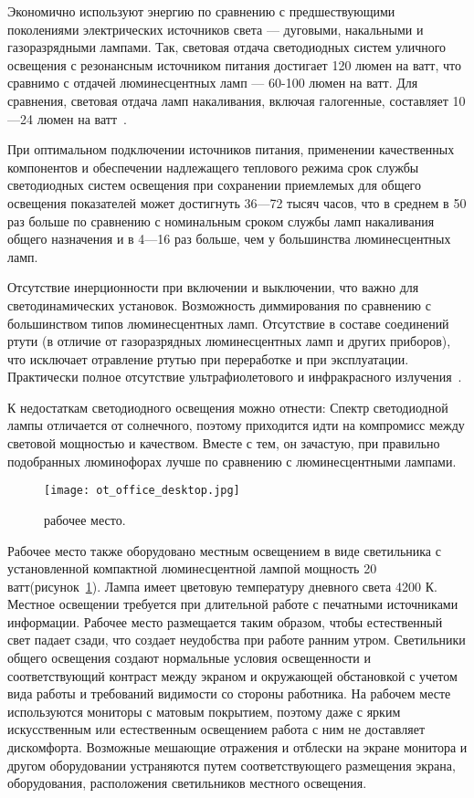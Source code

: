 Экономично используют энергию по сравнению с предшествующими поколениями электрических источников света --- дуговыми, накальными и газоразрядными лампами.
Так, световая отдача светодиодных систем уличного освещения с резонансным источником питания достигает 120 люмен на ватт, что сравнимо с отдачей люминесцентных ламп --- 60-100 люмен на ватт.
Для сравнения, световая отдача ламп накаливания, включая галогенные, составляет 10—24 люмен на ватт~\cite{ot_diod_lamp}.

При оптимальном подключении источников питания, применении качественных компонентов и обеспечении надлежащего теплового режима срок службы светодиодных систем освещения при сохранении приемлемых для общего освещения показателей может достигнуть 36—72 тысяч часов, что в среднем в 50 раз больше по сравнению с номинальным сроком службы ламп накаливания общего назначения и в 4—16 раз больше, чем у большинства люминесцентных ламп.

Отсутствие инерционности при включении и выключении, что важно для светодинамических установок.
Возможность диммирования по сравнению с большинством типов люминесцентных ламп.
Отсутствие в составе соединений ртути (в отличие от газоразрядных люминесцентных ламп и других приборов), что исключает отравление ртутью при переработке и при эксплуатации.
Практически полное отсутствие ультрафиолетового и инфракрасного излучения~\cite{ot_russia_encyclopedia}.

К недостаткам светодиодного освещения можно отнести: Спектр светодиодной лампы отличается от солнечного, поэтому приходится идти на компромисс между световой мощностью и качеством. Вместе с тем, он зачастую, при правильно подобранных люминофорах лучше по сравнению с люминесцентными лампами.

\begin{figure}[ht]
\centering
  \texttt{[image: ot\_office\_desktop.jpg]}
  \caption{ рабочее место. }
  \label{fig:office_desktop}
\end{figure}

Рабочее место также оборудовано местным освещением в виде светильника с установленной компактной люминесцентной лампой мощность 20 ватт(рисунок~\ref{fig:office_desktop}).
Лампа имеет цветовую температуру дневного света 4200 К.
Местное освещении требуется при длительной работе с печатными источниками информации.
Рабочее место размещается таким образом, чтобы естественный свет падает сзади, что создает неудобства при работе ранним утром.
Светильники общего освещения создают нормальные условия освещенности и соответствующий контраст между экраном и окружающей обстановкой с учетом вида работы и требований видимости со стороны работника.
На рабочем месте используются мониторы с матовым покрытием, поэтому даже с ярким искусственным или естественным освещением работа с ним не доставляет дискомфорта.
Возможные мешающие отражения и отблески на экране монитора и другом оборудовании устраняются путем соответствующего размещения экрана, оборудования, расположения светильников местного освещения.

